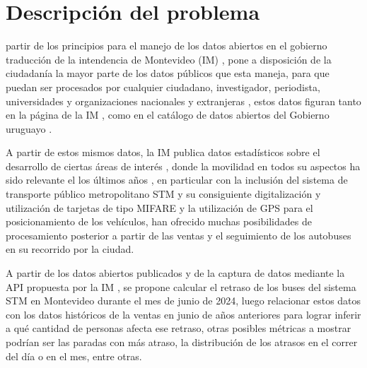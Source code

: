 \documentclass[journal]{IEEEtran}
\begin{document}
\section{Descripción del problema}
% 
% 
% 
% 
 partir de los principios para el manejo de los datos abiertos en el gobierno \cite{principios} traducción de la intendencia de Montevideo (IM) \cite{datos-abiertos} , pone a disposición  de la ciudadanía la mayor parte de los datos públicos que esta maneja, para que puedan ser procesados por cualquier ciudadano, investigador, periodista, universidades y organizaciones nacionales y extranjeras \cite{areas-tematicas}, estos datos figuran tanto en la página de la IM \cite{ckan}, como en el catálogo de datos abiertos del Gobierno uruguayo \cite{catalogo-datos}.

A partir de estos mismos datos, la IM publica datos estadísticos sobre el desarrollo de ciertas áreas de interés \cite{montevidata}, donde la movilidad en todos su aspectos ha sido relevante el los últimos años \cite{movilidad}, en particular con la inclusión del sistema de transporte público metropolitano STM y su consiguiente digitalización y utilización de tarjetas de tipo MIFARE \cite{mifare} y la utilización de GPS para el posicionamiento de los vehículos, han ofrecido muchas posibilidades de  procesamiento  posterior a partir de las ventas y el seguimiento de los autobuses en su recorrido por la ciudad.

A partir de los datos abiertos publicados y de la captura de datos mediante la API propuesta por la IM \cite{api-im}, se propone calcular el retraso de los buses del sistema STM en Montevideo durante el mes de junio de 2024, luego relacionar estos datos con los datos históricos de la ventas en junio de años anteriores para lograr inferir a qué cantidad de personas afecta ese retraso, otras posibles métricas a mostrar podrían ser las paradas con más atraso, la distribución de los atrasos en el correr del día o en el mes, entre otras.
\end{document}
